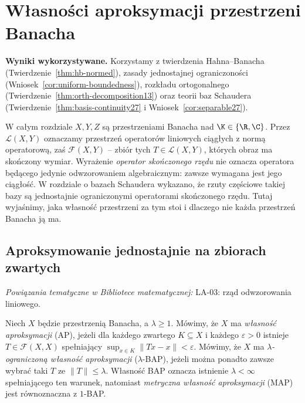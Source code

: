 \setcounter{section}{27}
\section{Własności aproksymacji przestrzeni Banacha}
\label{sec:aproksymacja28}

\providecommand{\atlasref}[2]{#2}

\noindent\textbf{Wyniki wykorzystywane.}
Korzystamy z twierdzenia Hahna--Banacha (Twierdzenie~\ref{thm:hb-normed}),
zasady jednostajnej ograniczoności (Wniosek~\ref{cor:uniform-boundedness}),
rozkładu ortogonalnego (Twierdzenie~\ref{thm:orth-decomposition13})
oraz teorii baz Schaudera (Twierdzenie~\ref{thm:basis-continuity27}
i Wniosek~\ref{cor:separable27}).
\par\medskip

W całym rozdziale $X,Y,Z$ są przestrzeniami Banacha nad
$\K\in\{\R,\C\}$. Przez $\mathcal L(X,Y)$ oznaczamy
przestrzeń operatorów liniowych ciągłych z normą operatorową, zaś
$\mathcal F(X,Y)$ -- zbiór tych $T\in\mathcal L(X,Y)$, których
obraz ma skończony wymiar. Wyrażenie \emph{operator skończonego rzędu}
nie oznacza operatora będącego jedynie odwzorowaniem algebraicznym:
zawsze wymagana jest jego ciągłość. W rozdziale o bazach Schaudera
wykazano, że rzuty częściowe takiej bazy są jednostajnie ograniczonymi
operatorami skończonego rzędu. Tutaj wyjaśnimy, jaka własność
przestrzeni za tym stoi i dlaczego nie każda przestrzeń Banacha ją ma.

\subsection{Aproksymowanie jednostajnie na zbiorach zwartych}

\noindent\emph{Powiązania tematyczne w Bibliotece matematycznej:} \atlasref{LA-03::def:lin3-rzad-nullity}{LA-03: rząd odwzorowania liniowego}.


\begin{definicja}
\label{def:ap-bap-map28}
Niech $X$ będzie przestrzenią Banacha, a $\lambda\ge1$.
Mówimy, że $X$ ma \emph{własność aproksymacji} (AP), jeżeli dla
każdego zwartego $K\subseteq X$ i każdego $\varepsilon>0$
istnieje $T\in\mathcal F(X,X)$ spełniający
$\sup_{x\in K}\|Tx-x\|<\varepsilon$.
Mówimy, że $X$ ma \emph{$\lambda$-ograniczoną własność aproksymacji}
($\lambda$-BAP), jeżeli można ponadto zawsze wybrać taki $T$
ze $\|T\|\le\lambda$. Własność BAP oznacza istnienie
$\lambda<\infty$ spełniającego ten warunek, natomiast
\emph{metryczna własność aproksymacji} (MAP) jest równoznaczna
z $1$-BAP.
\end{definicja}

